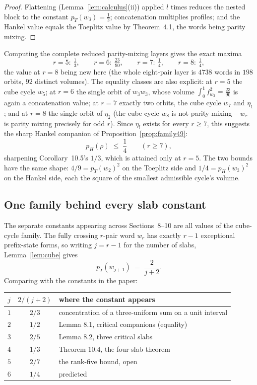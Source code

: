 \begin{proof}
Flattening (Lemma~\ref{lem:calculus}(ii)) applied $l$ times reduces the
nested block to the constant $p_T(w_3)=\tfrac12$; concatenation
multiplies profiles; and the Hankel value equals the Toeplitz value by
Theorem~4.1, the words being parity mixing.
\end{proof}

Computing the complete reduced parity-mixing layers gives the exact
maxima
\[
r=5:\ \tfrac13,\qquad r=6:\ \tfrac{23}{90},\qquad r=7:\ \tfrac14,
\qquad r=8:\ \tfrac14 ,
\]
the value at $r=8$ being new here (the whole eight-pair layer is $4738$
words in $198$ orbits, $92$ distinct volumes).  The equality classes are
also explicit: at $r=5$ the cube cycle $w_5$; at $r=6$ the single orbit
of $w_3w_3$, whose volume $\int_0^1f_{w_3}^2=\tfrac{23}{90}$ is again a
concatenation value; at $r=7$ exactly two orbits, the cube cycle $w_7$
and $\eta_1$; and at $r=8$ the single orbit of $\eta_2$ (the cube cycle
$w_8$ is not parity mixing -- $w_r$ is parity mixing precisely for odd
$r$).  Since $\eta_l$ exists for every $r\ge7$, this suggests the sharp
Hankel companion of Proposition~\ref{prop:family49}:
\[
p_H(\rho)\;\le\;\frac14\qquad(r\ge7),
\]
sharpening Corollary~10.5's $1/3$, which is attained only at $r=5$.  The
two bounds have the same shape: $4/9=p_T(w_2)^2$ on the Toeplitz side and
$1/4=p_H(w_3)^2$ on the Hankel side, each the square of the smallest
admissible cycle's volume.

\subsection*{One family behind every slab constant}

The separate constants appearing across Sections~8--10 are all values of
the cube-cycle family.  The fully crossing $r$-pair word $w_r$ has
exactly $r-1$ exceptional prefix-state forms, so writing $j=r-1$ for the
number of slabs, Lemma~\ref{lem:cube} gives
\[
p_T(w_{j+1})\;=\;\frac{2}{j+2}.
\]
Comparing with the constants in the paper:

\begin{center}
\begin{tabular}{c|c|l}
$j$ & $2/(j+2)$ & where the constant appears \\\hline
$1$ & $2/3$ & concentration of a three-uniform sum on a unit interval\\
$2$ & $1/2$ & Lemma 8.1, critical companions (equality)\\
$3$ & $2/5$ & Lemma 8.2, three critical slabs\\
$4$ & $1/3$ & Theorem 10.4, the four-slab theorem\\
$5$ & $2/7$ & the rank-five bound, open\\
$6$ & $1/4$ & predicted
\end{tabular}
\end{center}

